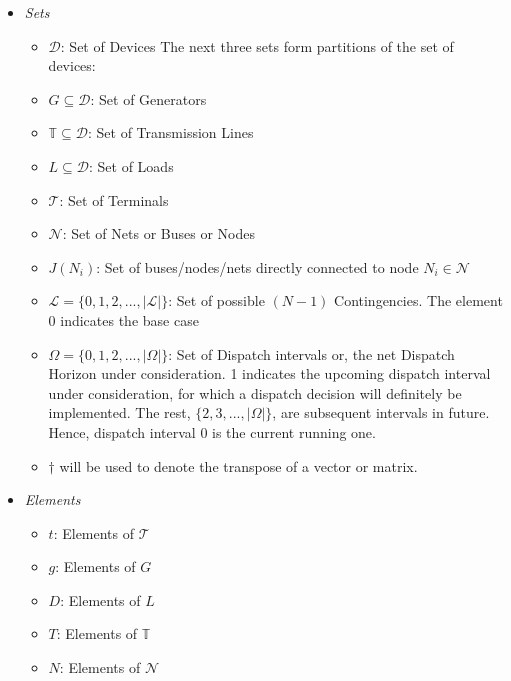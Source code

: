 \documentclass[preprint,12pt,3p]{elsarticle}
\begin{document}
	\begin{itemize}
		\item \textit{Sets}
		\begin{itemize}[label={}]
			\item $\mathcal{D}$: Set of Devices
			The next three sets form partitions of the set of devices:
			\item $G\subseteq\mathcal{D}$: Set of Generators
			\item $\mathbb{T}\subseteq\mathcal{D}$: Set of Transmission Lines
			\item $L\subseteq\mathcal{D}$: Set of Loads
			\item $\mathcal{T}$: Set of Terminals
			\item $\mathcal{N}$: Set of Nets or Buses or Nodes
			\item $J(N_i)$: Set of buses/nodes/nets directly connected to node $N_i\in\mathcal{N}$
			\item $\mathcal{L}=\{0,1,2,...,|\mathcal{L}|\}$: Set of possible $(N-1)$ Contingencies. The element 0 indicates the base case
			\item $\Omega=\{0, 1, 2, ..., |\Omega|\}$: Set of Dispatch intervals or, the net Dispatch Horizon under consideration. 1 indicates the upcoming dispatch interval under consideration, for which a dispatch decision will definitely be implemented. The rest, $\{2, 3, ..., |\Omega|\}$, are subsequent intervals in future. Hence, dispatch interval $0$  is the current running one. 
			\item $\dagger$ will be used to denote the transpose of a vector or matrix.
		\end{itemize}
		\item \textit{Elements}
		\begin{itemize}[label={}]
			\item $t$: Elements of $\mathcal{T}$
			\item $g$: Elements of $G$
			\item $D$: Elements of $L$
			\item $T$: Elements of $\mathbb{T}$
			\item $N$: Elements of $\mathcal{N}$

\end{itemize}
\end{itemize}
\end{document}

